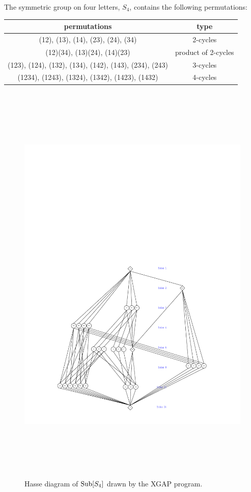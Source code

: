 
The symmetric group on four letters, $S_4$, contains the following permutations:

\begin{center}
\begin{tabular}{|c|c|}
\hline
permutations & type\\[4pt]
\hline
(12), (13), (14), (23), (24), (34) & 2-cycles \\[4pt]
(12)(34), (13)(24), (14)(23) & product of 2-cycles \\[4pt]
(123), (124), (132), (134), (142), (143), (234), (243) &  3-cycles \\[4pt]
(1234), (1243), (1324), (1342), (1423), (1432) & 4-cycles \\[4pt]
\hline
\end{tabular}
\end{center}

\begin{figure}[!ht]
\vspace{-9cm}
\hskip-1.5cm\includegraphics[height=20cm]{SubS4morelabels.pdf}%
\caption{Hasse diagram of $\operatorname{Sub}[S_4]$ drawn by the XGAP program.}
\label{fig:SubS4}
\end{figure}


